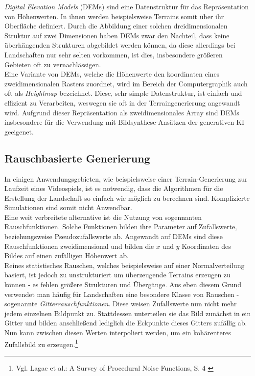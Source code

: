 \textit{Digital Elevation Models} (DEMs) sind eine Datenstruktur für das Repräsentation von Höhenwerten. In ihnen werden beispielsweise Terrains somit über ihr Oberfläche definiert. Durch die Abbildung einer solchen dreidimensionalen Struktur auf zwei Dimensionen haben DEMs zwar den Nachteil, dass keine überhängenden Strukturen abgebildet werden können, da diese allerdings bei Landschaften nur sehr selten vorkommen, ist dies, insbesondere größeren Gebieten oft zu vernachlässigen.\\
Eine Variante von DEMs, welche die Höhenwerte den koordinaten eines zweidimensionalen Rasters zuordnet, wird im Bereich der Computergraphik auch oft als \textit{Heightmap} bezeichnet. Diese, sehr simple Datenstruktur, ist einfach und effizient zu Verarbeiten, weswegen sie oft in der Terraingenerierung angewandt wird. Aufgrund dieser Repräsentation als zweidimensionales Array sind DEMs insbesondere für die Verwendung mit Bildsynthese-Ansätzen der generativen KI geeigenet.

\subsection{Rauschbasierte Generierung}

In einigen Anwendungsgebieten, wie beispielsweise einer Terrain-Generierung zur Laufzeit eines Videospiels, ist es notwendig, dass die Algorithmen für die Erstellung der Landschaft so einfach wie möglich zu berechnen sind. Komplizierte Simulationen sind somit nicht Anwendbar. \\ 
Eine weit verbreitete alternative ist die Nutzung von sogennanten Rauschfunktionen. Solche Funktionen bilden ihre Parameter auf Zufallswerte, beziehungsweise Pseudozufallswerte ab. Angewandt auf DEMs sind diese Rauschfunktionen zweidimensional und bilden die $x$ und $y$ Koordinaten des Bildes auf einen zufälligen Höhenwert ab. \\ 
Reines statistisches Rauschen, welches beispielsweise auf einer Normalverteilung basiert, ist jedoch zu unstrukturiert um überzeugende Terrains erzeugen zu können - es fehlen größere Strukturen und Übergänge. Aus eben diesem Grund verwendet man häufig für Landschaften eine besondere Klasse von Rauschen - sogenannte \textit{Gitterrauschfunktionen}. Diese weisen Zufallswerte nun nicht mehr jedem einzelnen Bildpunkt zu. Stattdessen unterteilen sie das Bild zunächst in ein Gitter und bilden anschließend lediglich die Eckpunkte dieses Gitters zufällig ab. Nun kann zwischen diesen Werten interpoliert werden, um ein kohärenteres Zufallsbild zu erzeugen.\footnote{
    Vgl. Lagae et al.: A Survey of Procedural Noise Functions, S. 4
    \cite{https://doi.org/10.1111/j.1467-8659.2010.01827.x}
}  

